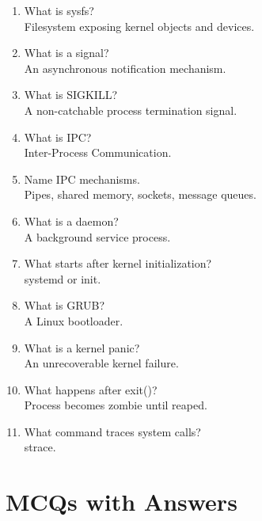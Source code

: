 \begin{enumerate}
\item What is sysfs?\\
Filesystem exposing kernel objects and devices.

\item What is a signal?\\
An asynchronous notification mechanism.

\item What is SIGKILL?\\
A non-catchable process termination signal.

\item What is IPC?\\
Inter-Process Communication.

\item Name IPC mechanisms.\\
Pipes, shared memory, sockets, message queues.

\item What is a daemon?\\
A background service process.

\item What starts after kernel initialization?\\
systemd or init.

\item What is GRUB?\\
A Linux bootloader.

\item What is a kernel panic?\\
An unrecoverable kernel failure.

\item What happens after exit()?\\
Process becomes zombie until reaped.

\item What command traces system calls?\\
strace.
\end{enumerate}

\section{MCQs with Answers}

